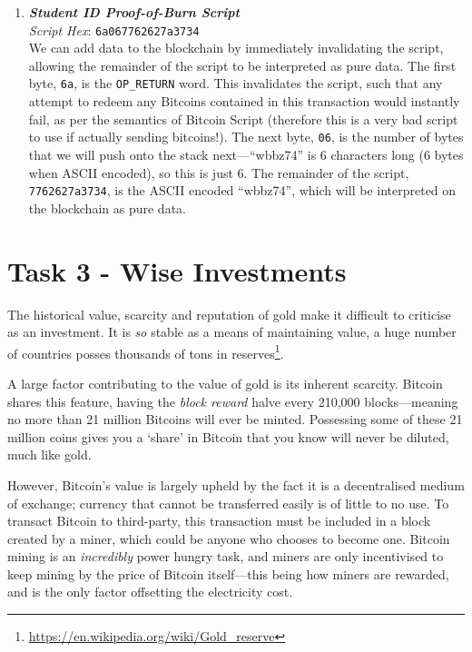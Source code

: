 \documentclass[11pt]{article}
\begin{document}
\begin{enumerate}
\item \textbf{\textit{Student ID Proof-of-Burn Script}}\\
\textit{Script Hex}: \texttt{6a067762627a3734}\\
We can add data to the blockchain by immediately invalidating the script, allowing the remainder of the script to be interpreted as pure data.
The first byte, \texttt{6a}, is the \texttt{OP\_RETURN} word. This invalidates the script, such that any attempt to redeem any Bitcoins contained in this transaction would instantly fail, as per the semantics of Bitcoin Script (therefore this is a very bad script to use if actually sending bitcoins!).
The next byte, \texttt{06}, is the number of bytes that we will push onto the stack next---``wbbz74'' is 6 characters long (6 bytes when ASCII encoded), so this is just 6. 
The remainder of the script, \texttt{7762627a3734}, is the ASCII encoded ``wbbz74'', which will be interpreted on the blockchain as pure data.

\end{enumerate}

\section*{Task 3 - Wise Investments}


The historical value, scarcity and reputation of gold make it difficult to criticise as an investment. It is \textit{so} stable as a means of maintaining value, a huge number of countries posses thousands of tons in reserves\footnote{\url{https://en.wikipedia.org/wiki/Gold_reserve}}.

A large factor contributing to the value of gold is its inherent scarcity. Bitcoin shares this feature, having the \textit{block reward} halve every 210,000 blocks---meaning no more than 21 million Bitcoins will ever be minted. Possessing some of these 21 million coins gives you a `share' in Bitcoin that you know will never be diluted, much like gold.

However, Bitcoin's value is largely upheld by the fact it is a decentralised medium of exchange; currency that cannot be transferred easily is of little to no use. To transact Bitcoin to third-party, this transaction must be included in a block created by a miner, which could be anyone who chooses to become one. Bitcoin mining is an \textit{incredibly} power hungry task, and miners are only incentivised to keep mining by the price of Bitcoin itself---this being how miners are rewarded, and is the only factor offsetting the electricity cost. 
\end{document}
